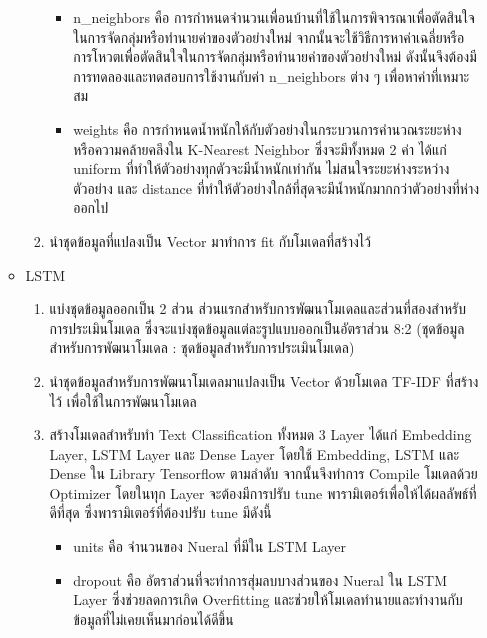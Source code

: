 \documentclass[12pt,oneside,openright,a4paper]{cpe-thai-project}
\begin{document}
\begin{enumerate}
\begin{itemize}
\begin{enumerate}
\begin{itemize}
                            \item n\_neighbors คือ การกำหนดจำนวนเพื่อนบ้านที่ใช้ในการพิจารณาเพื่อตัดสินใจในการจัดกลุ่มหรือทำนายค่าของตัวอย่างใหม่
                                  จากนั้นจะใช้วิธีการหาค่าเฉลี่ยหรือการโหวตเพื่อตัดสินใจในการจัดกลุ่มหรือทำนายค่าของตัวอย่างใหม่
                                  ดังนั้นจึงต้องมีการทดลองและทดสอบการใช้งานกับค่า n\_neighbors ต่าง ๆ เพื่อหาค่าที่เหมาะสม
                            \item weights คือ การกำหนดน้ำหนักให้กับตัวอย่างในกระบวนการคำนวณระยะห่างหรือความคล้ายคลึงใน K-Nearest Neighbor
                                  ซึ่งจะมีทั้งหมด 2 ค่า ได้แก่ uniform ที่ทำให้ตัวอย่างทุกตัวจะมีน้ำหนักเท่ากัน ไม่สนใจระยะห่างระหว่างตัวอย่าง
                                  และ distance ที่ทำให้ตัวอย่างใกล้ที่สุดจะมีน้ำหนักมากกว่าตัวอย่างที่ห่างออกไป
                          \end{itemize}
                    \item นำชุดข้อมูลที่แปลงเป็น Vector มาทำการ fit กับโมเดลที่สร้างไว้
                  \end{enumerate}
            \item LSTM
                  \begin{enumerate}
                    \item แบ่งชุดข้อมูลออกเป็น 2 ส่วน ส่วนแรกสำหรับการพัฒนาโมเดลและส่วนที่สองสำหรับการประเมินโมเดล 
                    ซึ่งจะแบ่งชุดข้อมูลแต่ละรูปแบบออกเป็นอัตราส่วน 8:2 (ชุดข้อมูลสำหรับการพัฒนาโมเดล : ชุดข้อมูลสำหรับการประเมินโมเดล) 
                    \item นำชุดข้อมูลสำหรับการพัฒนาโมเดลมาแปลงเป็น Vector ด้วยโมเดล TF-IDF ที่สร้างไว้ เพื่อใช้ในการพัฒนาโมเดล
                    \item สร้างโมเดลสำหรับทำ Text Classification ทั้งหมด 3 Layer ได้แก่ Embedding Layer, LSTM Layer และ Dense Layer
                          โดยใช้ Embedding, LSTM และ Dense ใน Library Tensorflow ตามลำดับ
                          จากนั้นจึงทำการ Compile โมเดลด้วย Optimizer
                          โดยในทุก Layer จะต้องมีการปรับ tune พารามิเตอร์เพื่อให้ได้ผลลัพธ์ที่ดีที่สุด ซึ่งพารามิเตอร์ที่ต้องปรับ tune มีดังนี้
                          \begin{itemize}
                            \item units คือ จำนวนของ Nueral ที่มีใน LSTM Layer
                            \item dropout คือ อัตราส่วนที่จะทำการสุ่มลบบางส่วนของ Nueral ใน LSTM Layer 
                                  ซึ่งช่วยลดการเกิด Overfitting และช่วยให้โมเดลทำนายและทำงานกับข้อมูลที่ไม่เคยเห็นมาก่อนได้ดีขึ้น

\end{itemize}
\end{enumerate}
\end{itemize}
\end{enumerate}
\end{document}
